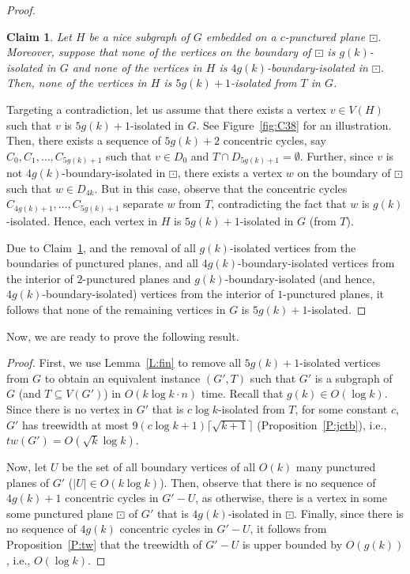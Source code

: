 \documentclass{article}
\newtheorem{claim}[theorem]{Claim}
\numberwithin{claimcounter}{lemma}
\newenvironment{proofofclaim}{\renewcommand{\qed}{\hfill $\diamond$}
  \renewcommand{\proofname}{Proof of Claim}\proof}{\endproof}
\begin{document}
\begin{proof}
    \begin{claim}\label{C:bd}
        Let $H$ be a nice subgraph of $G$ embedded on a $c$-punctured plane $\boxdot$. Moreover, suppose that none of the vertices on the boundary of $\boxdot$ is $g(k)$-isolated in $G$ and none of the vertices in $H$ is $4g(k)$-boundary-isolated in $\boxdot$. Then, none of the vertices in $H$ is $5g(k)+1$-isolated from $T$ in $G$.  
    \end{claim}
    \begin{proofofclaim}
        Targeting a contradiction, let us assume that there exists a vertex $v\in V(H)$ such that $v$ is $5g(k)+1$-isolated in $G$. See Figure~\ref{fig:C38} for an illustration. Then, there exists a sequence of $5g(k)+2$ concentric cycles, say $C_0,C_1,\ldots, C_{5g(k)+1}$ such that $v\in D_0$ and $T\cap D_{5g(k)+1}= \emptyset$. Further, since $v$ is not $4g(k)$-boundary-isolated in $\boxdot$, there exists a vertex $w$ on the boundary of $\boxdot$ such that $w\in D_{4k}$. But in this case, observe that the concentric cycles $C_{4g(k)+1}, \ldots, C_{5g(k)+1}$ separate $w$ from $T$, contradicting the fact that $w$ is $g(k)$-isolated. Hence, each vertex in $H$ is $5g(k)+1$-isolated in $G$ (from $T$). 
    \end{proofofclaim}



    Due to Claim~\ref{C:bd}, and the removal of all $g(k)$-isolated vertices from the boundaries of punctured planes, and all $4g(k)$-boundary-isolated vertices from the interior of  $2$-punctured planes and $g(k)$-boundary-isolated (and hence, $4g(k)$-boundary-isolated) vertices from the interior of $1$-punctured planes, it follows that none of the remaining vertices in $G$ is $5g(k)+1$-isolated. 
\end{proof}



Now, we are ready to prove the following result.
\TWReduction*
\begin{proof}
    First, we use Lemma~\ref{L:fin} to remove all $5g(k)+1$-isolated vertices from $G$ to obtain an equivalent instance $(G',T)$ such that $G'$ is a subgraph of $G$ (and $T\subseteq V(G')$) in $O(k\log k \cdot n)$ time. Recall that $g(k) \in O(\log k)$. Since there is no vertex in $G'$ that is $c\log k$-isolated from $T$,  for some constant $c$, $G'$ has treewidth at most $9(c\log k+1)\lceil \sqrt{k +1}\rceil$ (Proposition~\ref{P:jctb}), i.e.,  $tw(G') = O (\sqrt{k} \log k)$. 
    
    Now, let  $U$ be the set of all boundary vertices of all $O(k)$ many punctured planes of $G'$ ($|U| \in O(k \log k)$). Then, observe that  there is no sequence of  $4g(k)+1$ concentric cycles in $G'-U$, as otherwise, there is a vertex in some some punctured plane $\boxdot$ of $G'$ that is  $4g(k)$-isolated in $\boxdot$.  Finally, since there is no sequence of $4g(k)$ concentric cycles in $G'-U$, it follows from Proposition~\ref{P:tw} that the treewidth of $G'-U$ is upper bounded by $O(g(k))$, i.e., $O(\log k)$.
\end{proof}
\end{document}
